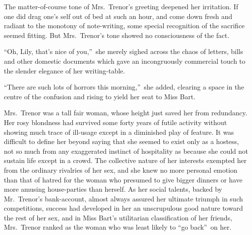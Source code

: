 \documentclass[12pt,a4paper]{book}
\begin{document}
The matter-of-course tone of Mrs.\ Trenor's greeting deepened her
irritation. If one did drag one's self out of bed at such an
hour, and come down fresh and radiant to the monotony of
note-writing, some special recognition of the sacrifice seemed
fitting. But Mrs.\ Trenor's tone showed no consciousness of the
fact.





``Oh, Lily, that's nice of you,''\ she merely sighed across the
chaos of letters, bills and other domestic documents which gave
an incongruously commercial touch to the slender elegance of her
writing-table.





``There are such lots of horrors this morning,''\ she added,
clearing a space in the centre of the confusion and rising to
yield her seat to Miss Bart.





Mrs.\ Trenor was a tall fair woman, whose height just saved her
from redundancy. Her rosy blondness had survived some forty years
of futile activity without showing much trace of ill-usage except
in a diminished play of feature. It was difficult to define her
beyond saying that she seemed to exist only as a hostess, not so
much from any exaggerated instinct of hospitality as because she
could not sustain life except in a crowd. The collective nature
of her interests exempted her from the ordinary rivalries of her
sex, and she knew no more personal emotion than that of hatred
for the woman who presumed to give bigger dinners or have more
amusing house-parties than herself. As her social talents, backed
by Mr.\ Trenor's bank-account, almost always assured her ultimate
triumph in such competitions, success had developed in her an
unscrupulous good nature toward the rest of her sex, and in Miss
Bart's utilitarian classification of her friends, Mrs.\ Trenor
ranked as the woman who was least likely to ``go back''\ on her.
\end{document}
